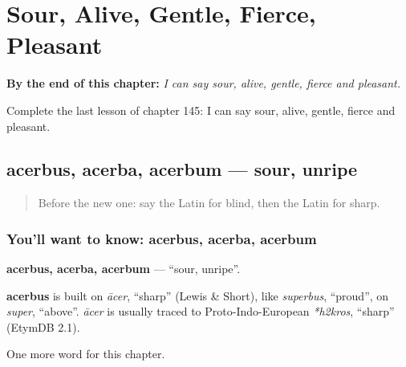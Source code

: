 
\chapter{Sour, Alive, Gentle, Fierce, Pleasant}
\label{ch:la-sour-alive-gentle-fierce-pleasant}

\begin{chapteropening}
\textbf{By the end of this chapter:} \emph{I can say sour, alive, gentle, fierce and pleasant.}

Complete the last lesson of chapter 145: I can say sour, alive, gentle, fierce and pleasant.
\end{chapteropening}

\section[acerbus, acerba, acerbum]{acerbus, acerba, acerbum — sour, unripe}

\label{lesson:LA-C145-acerbus}



\begin{quote}
Before the new one: say the Latin for blind, then the Latin for sharp.
\end{quote}

\subsection*{You'll want to know: acerbus, acerba, acerbum}
\textbf{acerbus, acerba, acerbum} — \textquotedblleft{}sour, unripe\textquotedblright{}.

\begin{cousinweb}
\textbf{acerbus} is built on \emph{ācer}, \textquotedblleft{}sharp\textquotedblright{} (Lewis \& Short), like \emph{superbus}, \textquotedblleft{}proud\textquotedblright{}, on \emph{super}, \textquotedblleft{}above\textquotedblright{}. \emph{ācer} is usually traced to Proto-Indo-European \emph{*h2kros}, \textquotedblleft{}sharp\textquotedblright{} (EtymDB 2.1).
\end{cousinweb}

\begin{grammarlens}[title={What you've built}]
One more word for this chapter.
\end{grammarlens}

